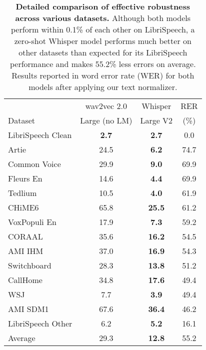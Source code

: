 \begin{table}[t]
\vskip 0.15in
\small
\begin{center}
\begin{tabular}{l|cc|c}
\toprule
& wav2vec 2.0 & Whisper & RER \\
Dataset & Large (no LM) & Large V2 & (\%) \\
\midrule
LibriSpeech Clean & \textbf{2.7} & \textbf{2.7} & 0.0 \\
\midrule
Artie & 24.5 & \textbf{6.2} & \color{Highlight}74.7 \\
Common Voice & 29.9 & \textbf{9.0} & \color{Highlight}69.9 \\
Fleurs En & 14.6 & \textbf{4.4} & \color{Highlight}69.9 \\
Tedlium & 10.5 & \textbf{4.0} & \color{Highlight}61.9 \\
CHiME6 & 65.8 & \textbf{25.5} & \color{Highlight}61.2 \\
VoxPopuli En & 17.9 & \textbf{7.3} & \color{Highlight}59.2 \\
CORAAL & 35.6 & \textbf{16.2} & \color{Highlight}54.5 \\
AMI IHM & 37.0 & \textbf{16.9} & \color{Highlight}54.3 \\
Switchboard & 28.3 & \textbf{13.8} & \color{Highlight}51.2 \\
CallHome & 34.8 & \textbf{17.6} & \color{Highlight}49.4 \\
WSJ & 7.7 & \textbf{3.9} & \color{Highlight}49.4 \\
AMI SDM1 & 67.6 & \textbf{36.4} & \color{Highlight}46.2 \\
LibriSpeech Other & 6.2 & \textbf{5.2} & \color{Highlight}16.1 \\
\midrule
Average & 29.3 & \textbf{12.8} & \color{Highlight}55.2 \\

\bottomrule
\end{tabular}
\caption{\textbf{Detailed comparison of effective robustness across various datasets.} Although both models perform within 0.1\% of each other on LibriSpeech, a zero-shot Whisper model performs much better on other datasets than expected for its LibriSpeech performance and makes 55.2\% less errors on average. Results reported in word error rate (WER) for both models after applying our text normalizer.}
\label{robustness_table}
\end{center}
\vspace{-1em}
\end{table}

